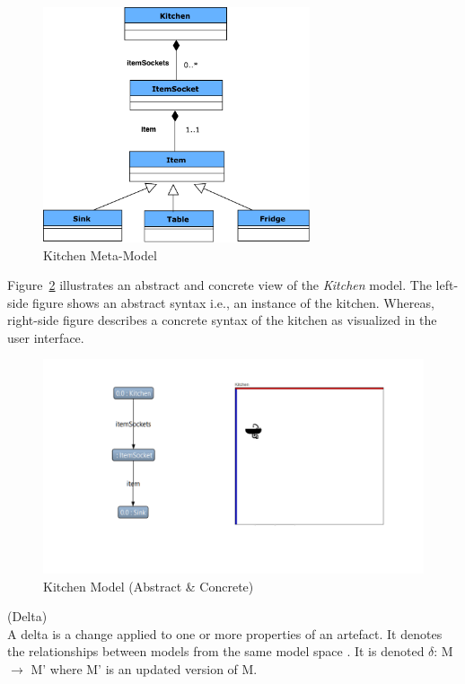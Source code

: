 \begin{figure}
	\centering
	\includegraphics[width=0.7\textwidth]{figures/Kitchen_MetaModel}
	\caption{Kitchen Meta-Model}
	\label{fig:Kitchen_MetaModel}
\end{figure}

Figure~\ref{fig:Kitchen_AbstractConcrete} illustrates an abstract and concrete view of the \textit{Kitchen} model. The left-side figure shows an abstract syntax i.e., an instance of the kitchen. Whereas, right-side figure describes a concrete syntax of the kitchen as visualized in the user interface.\\

\begin{figure}
	\centering
	\includegraphics[width=1\textwidth]{figures/Kitchen_AbstractConcrete}
	\caption{Kitchen Model (Abstract \& Concrete)}
	\label{fig:Kitchen_AbstractConcrete}
\end{figure}

\begin{defn}\label{defDelta} (Delta)\\
A delta is a change applied to one or more properties of an artefact. It denotes the relationships between models from the same model space \cite{benchmarx-reload}. It is denoted $\delta$: M $\longrightarrow$ M' where M' is an updated version of M.
\end{defn}

